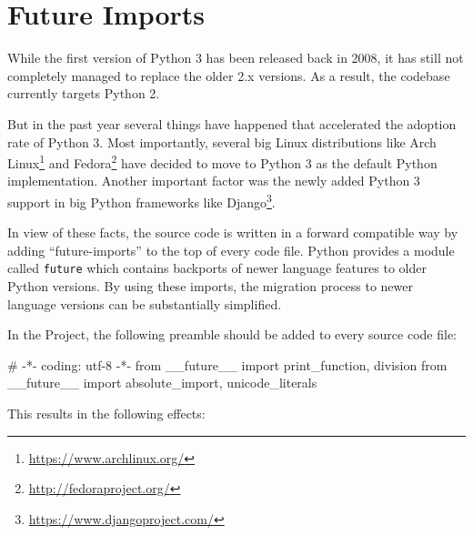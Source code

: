 
\section{Future Imports}\label{sec:development:futures}

While the first version of Python 3 has been released back in 2008, it has still
not completely managed to replace the older 2.x versions. As a result, the
\tangible{} codebase currently targets Python 2.

But in the past year several things have happened that accelerated the adoption
rate of Python 3. Most importantly, several big Linux distributions like Arch
Linux\footnote{\url{https://www.archlinux.org/}} and
Fedora\footnote{\url{http://fedoraproject.org/}} have decided to move to Python
3 as the default Python implementation. Another important factor was the newly
added Python 3 support in big Python frameworks like
Django\footnote{\url{https://www.djangoproject.com/}}.

In view of these facts, the \tangible{} source code is written in a forward
compatible way by adding ``future-imports'' to the top of every code file.
Python provides a module called \texttt{future} which contains backports of
newer language features to older Python versions. By using these imports, the
migration process to newer language versions can be substantially simplified.

In the \tangible{} Project, the following preamble should be added to every
source code file:

\vspace{.5\baselineskip}
\begin{pythoncode}
# -*- coding: utf-8 -*-
from __future__ import print_function, division
from __future__ import absolute_import, unicode_literals
\end{pythoncode}

\noindent This results in the following effects:

